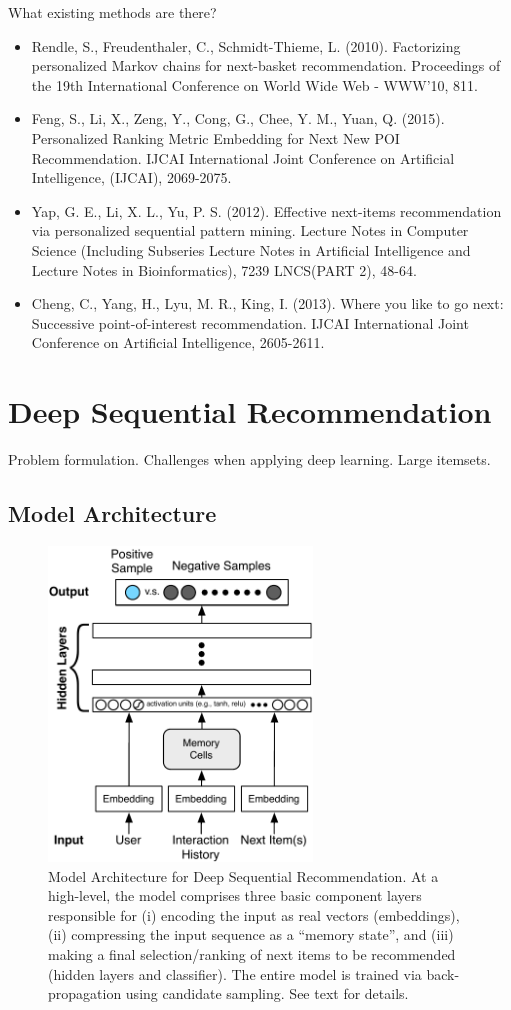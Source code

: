 \documentclass{sig-alternate-05-2015}
\begin{document}
What existing methods are there?
\begin{itemize}
\item Rendle, S., Freudenthaler, C., Schmidt-Thieme, L. (2010). Factorizing personalized Markov chains for next-basket recommendation. Proceedings of the 19th International Conference on World Wide Web - WWW'10, 811.
\item Feng, S., Li, X., Zeng, Y., Cong, G., Chee, Y. M., Yuan, Q. (2015). Personalized Ranking Metric Embedding for Next New POI Recommendation. IJCAI International Joint Conference on Artificial Intelligence, (IJCAI), 2069-2075.
\item Yap, G. E., Li, X. L., Yu, P. S. (2012). Effective next-items recommendation via personalized sequential pattern mining. Lecture Notes in Computer Science (Including Subseries Lecture Notes in Artificial Intelligence and Lecture Notes in Bioinformatics), 7239 LNCS(PART 2), 48-64.
\item Cheng, C., Yang, H., Lyu, M. R., King, I. (2013). Where you like to go next: Successive point-of-interest recommendation. IJCAI International Joint Conference on Artificial Intelligence, 2605-2611.
\end{itemize}
 
\section{Deep Sequential Recommendation}

Problem formulation. Challenges when applying deep learning. Large itemsets. 

\subsection{Model Architecture}

\begin{figure}
\centering
	\includegraphics[width=7cm]{images/ModelArch}
	\caption{Model Architecture for Deep Sequential Recommendation. At a high-level, the model comprises three basic component layers responsible for (i) encoding the input as real vectors (embeddings), (ii) compressing the input sequence as a ``memory state'', and (iii) making a final selection/ranking of next items to be recommended (hidden layers and classifier). The entire model is trained via back-propagation using candidate sampling. See text for details.}
	\label{fig:ModelArch}
\end{figure}
\end{document}
